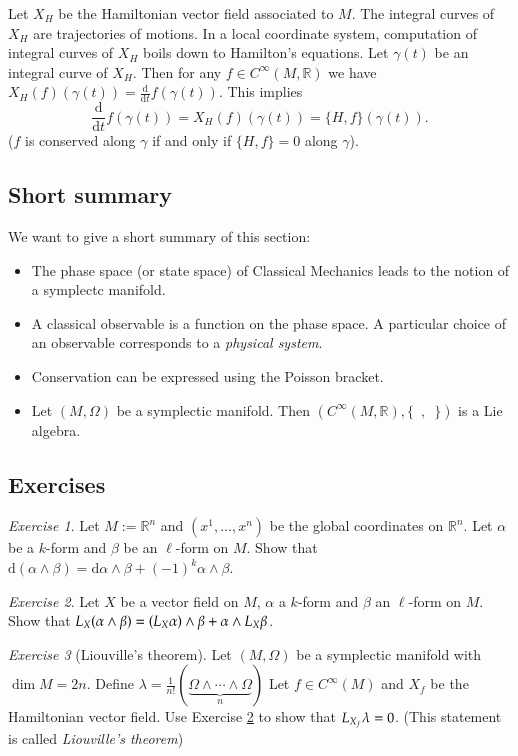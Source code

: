\documentclass[11pt]{amsart}
\numberwithin{equation}{section}
\theoremstyle{plain}
\theoremstyle{definition}
\theoremstyle{remark}
\newtheorem{exe}{Exercise}[subsection]
\newcommand{\R}{\mathbb{R}}
\newcommand{\dd}{{\mathrm{d}}}
\begin{document}
Let $X_H$ be the Hamiltonian vector field associated to $M$. The integral curves of $X_H$ are trajectories of motions. In a local coordinate system, computation of integral curves of $X_H$ boils down to Hamilton's equations. Let $\gamma(t)$ be an integral curve of $X_H$. Then for any $f\in C^\infty(M,\R)$ we have $X_H(f)(\gamma(t))=\frac{\dd}{\dd t}f(\gamma(t))$. This implies 
\[
\frac{\dd}{\dd t}f(\gamma(t))=X_H(f)(\gamma(t))=\{H,f\}(\gamma(t)).
\]
($f$ is conserved along $\gamma$ if and only if $\{H,f\}=0$ along $\gamma$).


\subsection{Short summary}
We want to give a short summary of this section:
\begin{itemize}
\item{The phase space (or state space) of Classical Mechanics leads to the notion of a symplectc manifold.
}
\item{A classical observable is a function on the phase space. A particular choice of an observable corresponds to a \emph{physical system}.
}
\item{Conservation can be expressed using the Poisson bracket.
}
\item{Let $(M,\Omega)$ be a symplectic manifold. Then $(C^\infty(M,\R),\{\enspace,\enspace\})$ is a Lie algebra.
}
\end{itemize}


\subsection{Exercises}

\begin{exe}
Let $M:=\R^n$ and $(x^1,...,x^n)$ be the global coordinates on $\R^n$. Let $\alpha$ be a $k$-form and $\beta$ be an $\ell$-form on $M$. 
Show that $\dd(\alpha\land\beta)=\dd\alpha\land \beta+(-1)^k\alpha\land \beta$.
\end{exe}

\begin{exe}
\label{ex_mnf}
Let $X$ be a vector field on $M$, $\alpha$ a $k$-form and $\beta$ an $\ell$-form on $M$. Show that $\emph{L}_X(\alpha\land\beta)=(\emph{L}_X\alpha)\land \beta+\alpha\land\emph{L}_X\beta$.
\end{exe}

\begin{exe}[Liouville's theorem]
Let $(M,\Omega)$ be a symplectic manifold with $\dim M=2n$. Define $\lambda=\frac{1}{n!}(\underbrace{\Omega\land\dotsm\land\Omega}_{n})$ Let $f\in C^\infty(M)$ and $X_f$ be the Hamiltonian vector field. Use Exercise \ref{ex_mnf} to show that $\emph{L}_{X_f}\lambda=0$. (This statement is called \emph{Liouville's theorem})
\end{exe}
\end{document}
